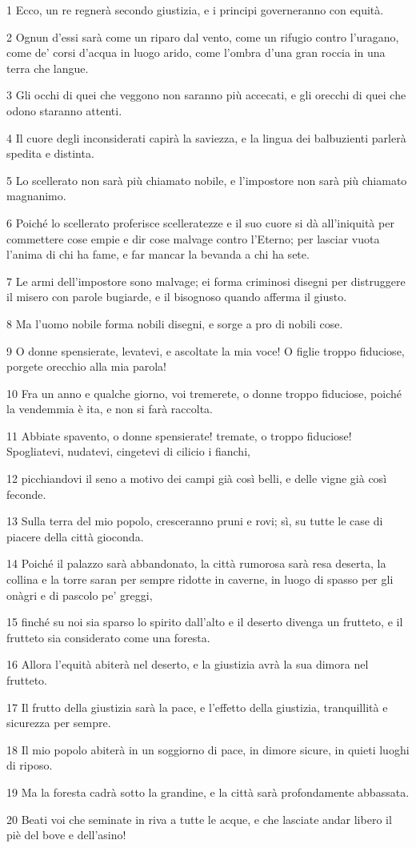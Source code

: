 \par 1 Ecco, un re regnerà secondo giustizia, e i principi governeranno con equità.
\par 2 Ognun d'essi sarà come un riparo dal vento, come un rifugio contro l'uragano, come de' corsi d'acqua in luogo arido, come l'ombra d'una gran roccia in una terra che langue.
\par 3 Gli occhi di quei che veggono non saranno più accecati, e gli orecchi di quei che odono staranno attenti.
\par 4 Il cuore degli inconsiderati capirà la saviezza, e la lingua dei balbuzienti parlerà spedita e distinta.
\par 5 Lo scellerato non sarà più chiamato nobile, e l'impostore non sarà più chiamato magnanimo.
\par 6 Poiché lo scellerato proferisce scelleratezze e il suo cuore si dà all'iniquità per commettere cose empie e dir cose malvage contro l'Eterno; per lasciar vuota l'anima di chi ha fame, e far mancar la bevanda a chi ha sete.
\par 7 Le armi dell'impostore sono malvage; ei forma criminosi disegni per distruggere il misero con parole bugiarde, e il bisognoso quando afferma il giusto.
\par 8 Ma l'uomo nobile forma nobili disegni, e sorge a pro di nobili cose.
\par 9 O donne spensierate, levatevi, e ascoltate la mia voce! O figlie troppo fiduciose, porgete orecchio alla mia parola!
\par 10 Fra un anno e qualche giorno, voi tremerete, o donne troppo fiduciose, poiché la vendemmia è ita, e non si farà raccolta.
\par 11 Abbiate spavento, o donne spensierate! tremate, o troppo fiduciose! Spogliatevi, nudatevi, cingetevi di cilicio i fianchi,
\par 12 picchiandovi il seno a motivo dei campi già così belli, e delle vigne già così feconde.
\par 13 Sulla terra del mio popolo, cresceranno pruni e rovi; sì, su tutte le case di piacere della città gioconda.
\par 14 Poiché il palazzo sarà abbandonato, la città rumorosa sarà resa deserta, la collina e la torre saran per sempre ridotte in caverne, in luogo di spasso per gli onàgri e di pascolo pe' greggi,
\par 15 finché su noi sia sparso lo spirito dall'alto e il deserto divenga un frutteto, e il frutteto sia considerato come una foresta.
\par 16 Allora l'equità abiterà nel deserto, e la giustizia avrà la sua dimora nel frutteto.
\par 17 Il frutto della giustizia sarà la pace, e l'effetto della giustizia, tranquillità e sicurezza per sempre.
\par 18 Il mio popolo abiterà in un soggiorno di pace, in dimore sicure, in quieti luoghi di riposo.
\par 19 Ma la foresta cadrà sotto la grandine, e la città sarà profondamente abbassata.
\par 20 Beati voi che seminate in riva a tutte le acque, e che lasciate andar libero il piè del bove e dell'asino!

